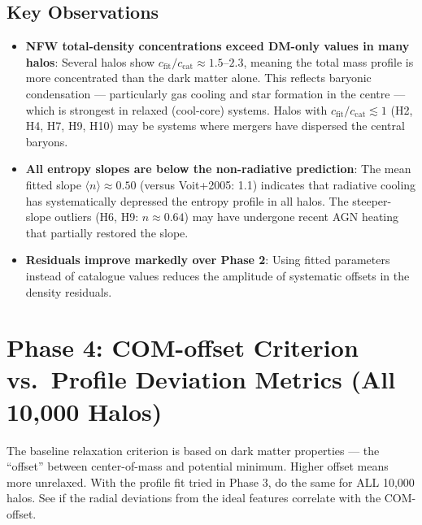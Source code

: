 \documentclass[12pt,a4paper]{article}
\begin{document}
\subsection{Key Observations}

\begin{itemize}
  \item \textbf{NFW total-density concentrations exceed DM-only values in many halos}:
        Several halos show $c_\mathrm{fit}/c_\mathrm{cat} \approx 1.5$--$2.3$,
        meaning the total mass profile is more concentrated than the dark matter alone.
        This reflects baryonic condensation --- particularly gas cooling and star
        formation in the centre --- which is strongest in relaxed (cool-core) systems.
        Halos with $c_\mathrm{fit}/c_\mathrm{cat} \lesssim 1$ (H2, H4, H7, H9, H10)
        may be systems where mergers have dispersed the central baryons.

  \item \textbf{All entropy slopes are below the non-radiative prediction}:
        The mean fitted slope $\langle n \rangle \approx 0.50$ (versus Voit+2005: 1.1)
        indicates that radiative cooling has systematically depressed the entropy profile
        in all halos. The steeper-slope outliers (H6, H9: $n\approx0.64$) may have
        undergone recent AGN heating that partially restored the slope.

  \item \textbf{Residuals improve markedly over Phase 2}: Using fitted parameters
        instead of catalogue values reduces the amplitude of systematic offsets in
        the density residuals.
\end{itemize}

\section{Phase 4: COM-offset Criterion vs.\ Profile Deviation Metrics (All 10,000 Halos)}
\label{sec:phase4}

\begin{querybox}
\textcolor{red!80!black}{%
The baseline relaxation criterion is based on dark matter properties ---
the ``offset'' between center-of-mass and potential minimum.
Higher offset means more unrelaxed.
With the profile fit tried in Phase 3, do the same for ALL 10,000 halos.
See if the radial deviations from the ideal features correlate with the COM-offset.}
\end{querybox}
\end{document}
